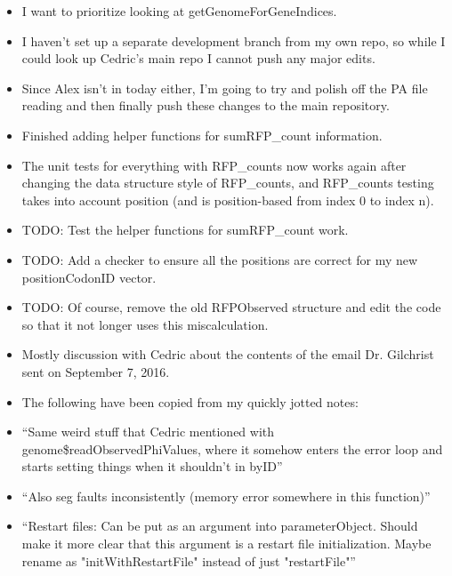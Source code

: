 \documentclass[12pt,hyperref]{labbook}
\newcommand{\sep}{\discretionary{}{}{}} %
\begin{document}
\begin{itemize}
    \item I want to prioritize looking at getGenomeForGeneIndices.
    \item I haven't set up a separate development branch from my own repo, so while I could look up Cedric's main repo I cannot push any major edits.
    \item Since Alex isn't in today either, I'm going to try and polish off the PA file reading and then finally push these changes to the main repository.
    \item Finished adding helper functions for sumRFP\_count information.
    \item The unit tests for everything with RFP\_counts now works again after changing the data structure style of RFP\_counts, and RFP\_counts testing takes into account position (and is position-based from index 0 to index n).
    \item TODO: Test the helper functions for sumRFP\_count work.
    \item TODO: Add a checker to ensure all the positions are correct for my new positionCodonID vector.
    \item TODO: Of course, remove the old RFPObserved structure and edit the code so that it not longer uses this miscalculation.
\end{itemize}


\begin{itemize}
    \item Mostly discussion with Cedric about the contents of the email Dr. Gilchrist sent on September 7, 2016.
    \item The following have been copied from my quickly jotted notes:
    \item \enquote{Same weird stuff that Cedric mentioned with genome\$read\sep Observed\sep Phi\sep Values, where it somehow enters the error loop and starts setting things when it shouldn’t in byID}
    \item \enquote{Also seg faults inconsistently (memory error somewhere in this function)}
    \item \enquote{Restart files: Can be put as an argument into parameterObject. Should make it more clear that this argument is a restart file initialization. Maybe rename as "initWithRestartFile" instead of just "restartFile"}
\end{itemize}

\end{document}
